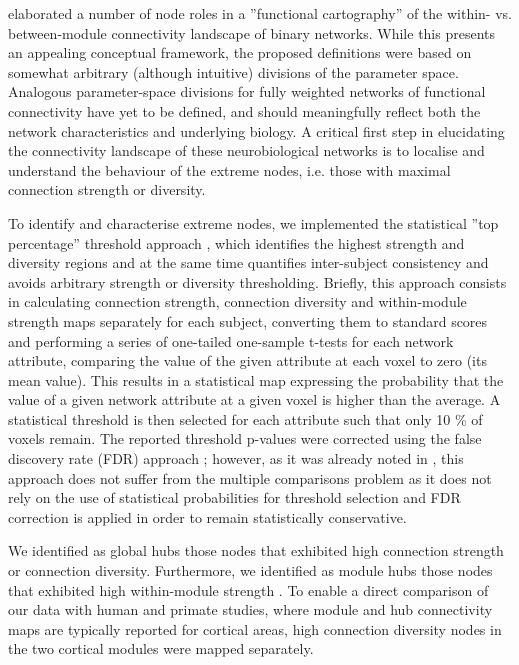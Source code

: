 \textcite{guimera2005} elaborated a number of node roles in a
''functional cartography'' of the within- vs. between-module connectivity
landscape of binary networks. While this presents an appealing conceptual
framework, the proposed definitions were based on somewhat arbitrary (although
intuitive) divisions of the parameter space. Analogous parameter-space divisions
for fully weighted networks of functional connectivity have yet to be defined,
and should meaningfully reflect both the network characteristics and underlying
biology. A critical first step in elucidating the connectivity landscape of
these neurobiological networks is to localise and understand the behaviour of
the extreme nodes, i.e. those with maximal connection strength or diversity. 

To identify and characterise extreme nodes, we implemented the statistical ''top
percentage'' threshold approach \parencite{cole2010}, which identifies the
highest strength and diversity regions and at the same time quantifies
inter-subject consistency and avoids arbitrary strength or diversity
thresholding. Briefly, this approach consists in calculating connection
strength, connection diversity and within-module strength maps separately for
each subject, converting them to standard scores and performing a series of
one-tailed one-sample t-tests for each network attribute, comparing the value of
the given attribute at each voxel to zero (its mean value). This results in a
statistical map expressing the probability that the value of a given network
attribute at a given voxel is higher than the average. A statistical threshold
is then selected for each attribute such that only 10 \% of voxels remain. The
reported threshold p-values were corrected using the false discovery rate (FDR)
approach \parencite{genovese2002}; however, as it was already noted in
\parencite{cole2010}, this approach does not suffer from the multiple
comparisons problem as it does not rely on the use of statistical probabilities
for threshold selection and FDR correction is applied in order to remain
statistically conservative.

We identified as global hubs those nodes that exhibited high connection strength
or connection diversity. Furthermore, we identified as module hubs those nodes
that exhibited high within-module strength \parencite{guimera2005}. To enable a
direct comparison of our data with human and primate studies, where module and
hub connectivity maps are typically reported for cortical areas, high connection
diversity nodes in the two cortical modules were mapped separately. 

